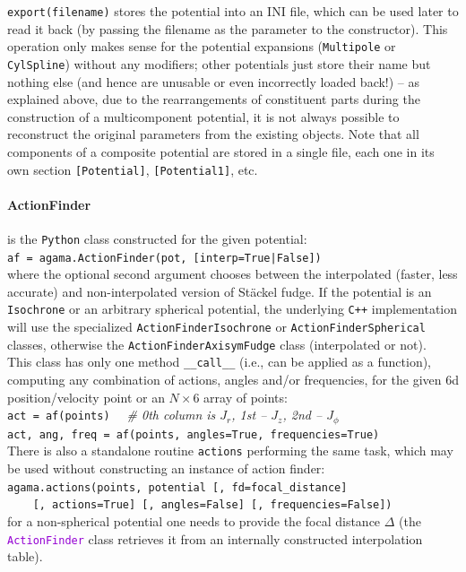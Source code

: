 \documentclass[12pt]{article}
\newcommand{\Cpp}  {\texttt{C++}\xspace}
\newcommand{\Python}{\texttt{Python}\xspace}
\newcommand{\ttt}[1]{\textcolor{darkviolet}{\texttt{#1}}}
\newcommand{\ppp}[1]{\textcolor{darkolive} {\texttt{#1}}}
\begin{document}
\texttt{export(filename)} stores the potential into an INI file, which can be used later to read it back (by passing the filename as the parameter to the constructor). This operation only makes sense for the potential expansions (\ppp{Multipole} or \ppp{CylSpline}) without any modifiers; other potentials just store their name but nothing else (and hence are unusable or even incorrectly loaded back!) -- as explained above, due to the rearrangements of constituent parts during the construction of a multicomponent potential, it is not always possible to reconstruct the original parameters from the existing objects. Note that all components of a composite potential are stored in a single file, each one in its own section \texttt{[Potential]}, \texttt{[Potential1]}, etc.

\paragraph{ActionFinder} is the \Python class constructed for the given potential:\\
\texttt{af = agama.ActionFinder(pot, [interp=True|False])}\\
where the optional second argument chooses between the interpolated (faster, less accurate) and non-interpolated version of St\"ackel fudge. If the potential is an \ppp{Isochrone} or an arbitrary spherical potential, the underlying \Cpp implementation will use the specialized \ppp{ActionFinderIsochrone} or \ppp{ActionFinderSpherical} classes, otherwise the \ppp{ActionFinder\-AxisymFudge} class (interpolated or not).\\
This class has only one method \texttt{__call__} (i.e., can be applied as a function), computing any combination of actions, angles and/or frequencies, for the given 6d position/velocity point or an $N\times6$ array of points:\\[1mm]
\texttt{act = af(points)}
\textit{\color{Sepia}\ \ \# 0th column is $J_r$, 1st -- $J_z$, 2nd -- $J_\phi$} \\
\texttt{act, ang, freq = af(points, angles=True, frequencies=True)}\\[2mm]
There is also a standalone routine \texttt{actions} performing the same task, which may be used without constructing an instance of action finder:\\[1mm]
\texttt{agama.actions(points, potential [, fd=focal_distance]}\\
\texttt{\mbox{}~~~~[, actions=True] [, angles=False] [, frequencies=False])}\\[1mm]
for a non-spherical potential one needs to provide the focal distance $\Delta$ (the \ttt{ActionFinder} class retrieves it from an internally constructed interpolation table).
\end{document}
